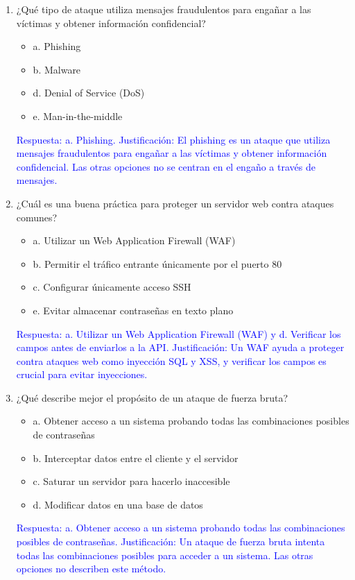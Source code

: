 \documentclass[a4paper]{article}
\begin{document}
\begin{enumerate}
    \item ¿Qué tipo de ataque utiliza mensajes fraudulentos para engañar a las víctimas y obtener información confidencial? 
    \begin{itemize}
        \item a. Phishing
        \item b. Malware
        \item d. Denial of Service (DoS)
        \item e. Man-in-the-middle
    \end{itemize}
    \textcolor{blue}{Respuesta: a. Phishing. Justificación: El phishing es un ataque que utiliza mensajes fraudulentos para engañar a las víctimas y obtener información confidencial. Las otras opciones no se centran en el engaño a través de mensajes.}
    \vspace{1cm} %
    
    \item ¿Cuál es una buena práctica para proteger un servidor web contra ataques comunes? 
    \begin{itemize}
        \item a. Utilizar un Web Application Firewall (WAF)
        \item b. Permitir el tráfico entrante únicamente por el puerto 80
        \item c. Configurar únicamente acceso SSH
        \item e. Evitar almacenar contraseñas en texto plano
    \end{itemize}
    \textcolor{blue}{Respuesta: a. Utilizar un Web Application Firewall (WAF) y d. Verificar los campos antes de enviarlos a la API. Justificación: Un WAF ayuda a proteger contra ataques web como inyección SQL y XSS, y verificar los campos es crucial para evitar inyecciones.}
    \vspace{1cm}
    
    \item ¿Qué describe mejor el propósito de un ataque de fuerza bruta? 
    \begin{itemize}
        \item a. Obtener acceso a un sistema probando todas las combinaciones posibles de contraseñas
        \item b. Interceptar datos entre el cliente y el servidor
        \item c. Saturar un servidor para hacerlo inaccesible
        \item d. Modificar datos en una base de datos
    \end{itemize}
    \textcolor{blue}{Respuesta: a. Obtener acceso a un sistema probando todas las combinaciones posibles de contraseñas. Justificación: Un ataque de fuerza bruta intenta todas las combinaciones posibles para acceder a un sistema. Las otras opciones no describen este método.}
    \vspace{1cm}
    

\end{enumerate}
\end{document}
